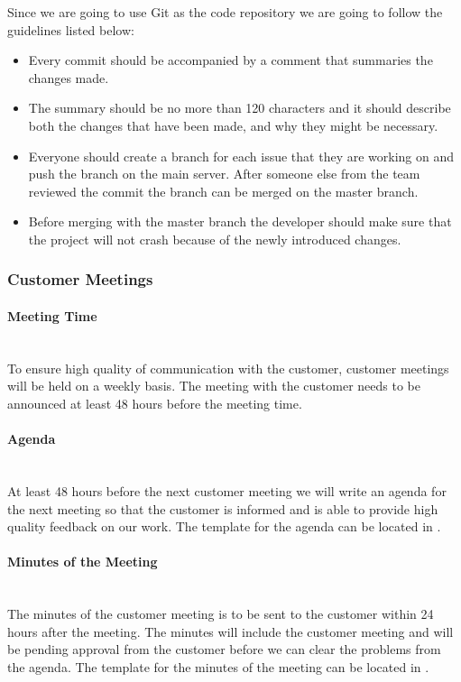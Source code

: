 \documentclass[../document.tex]{subfiles}
\begin{document}
Since we are going to use Git as the code repository we are going to follow the guidelines listed below:
\begin{itemize}
\item
Every commit should be accompanied by a comment that summaries the changes made. 
\item
The summary should be no more than 120 characters and it should describe both the changes that have been made, and why they might be necessary.
\item
Everyone should create a branch for each issue that they are working on and push the branch on the main server. After someone else from the team reviewed the commit the branch can be merged on the master branch.
\item
Before merging with the master branch the developer should make sure that the project will not crash because of the newly introduced changes.
\end{itemize}

\subsubsection{Customer Meetings}
\paragraph{Meeting Time} \ \\
To ensure high quality of communication with the customer, customer meetings will be held on a weekly basis. The meeting with the customer needs to be announced at least 48 hours before the meeting time.

\paragraph{Agenda} \ \\
At least 48 hours before the next customer meeting we will write an agenda for the next meeting so that the customer is informed and is able to provide high quality feedback on our work. The template for the agenda can be located in .

\paragraph{Minutes of the Meeting} \ \\
The minutes of the customer meeting is to be sent to the customer within 24 hours after the meeting. The minutes will include the customer meeting and will be pending approval from the customer before we can clear the problems from the agenda. The template for the minutes of the meeting can be located in .
\end{document}
